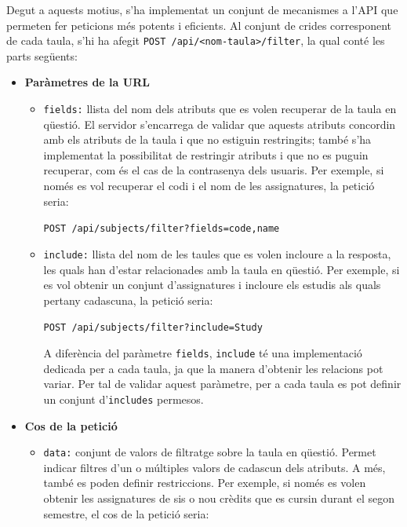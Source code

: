 \documentclass[a4paper,12pt]{ThesisStyle}
\begin{document}
Degut a aquests motius, s'ha implementat un conjunt de mecanismes a l'API que permeten fer peticions més potents i eficients. Al conjunt de crides corresponent de cada taula, s'hi ha afegit \texttt{POST /api/<nom-taula>/filter}, la qual conté les parts següents:
\begin{itemize}
  \item \textbf{Paràmetres de la URL}
  \begin{itemize}
    \item \texttt{fields:} llista del nom dels atributs que es volen recuperar de la taula en qüestió. El servidor s'encarrega de validar que aquests atributs concordin amb els atributs de la taula i que no estiguin restringits; també s'ha implementat la possibilitat de restringir atributs i que no es puguin recuperar, com és el cas de la contrasenya dels usuaris. Per exemple, si només es vol recuperar el codi i el nom de les assignatures, la petició seria:\\[-0.6cm]
    \begin{center}
      \texttt{POST /api/subjects/filter?fields=code,name}
    \end{center}
    \item \texttt{include:} llista del nom de les taules que es volen incloure a la resposta, les quals han d'estar relacionades amb la taula en qüestió. Per exemple, si es vol obtenir un conjunt d'assignatures i incloure els estudis als quals pertany cadascuna, la petició seria:\\[-0.6cm]
    \begin{center}
      \texttt{POST /api/subjects/filter?include=Study}
    \end{center}
    A diferència del paràmetre \texttt{fields}, \texttt{include} té una implementació dedicada per a cada taula, ja que la manera d'obtenir les relacions pot variar. Per tal de validar aquest paràmetre, per a cada taula es pot definir un conjunt d'\texttt{includes} permesos.
  \end{itemize}
  \item \textbf{Cos de la petició}
  \begin{itemize}
    \item \texttt{data:} conjunt de valors de filtratge sobre la taula en qüestió. Permet indicar filtres d'un o múltiples valors de cadascun dels atributs. A més, també es poden definir restriccions. Per exemple, si només es volen obtenir les assignatures de sis o nou crèdits que es cursin durant el segon semestre, el cos de la petició seria:\\[-0.6cm]

\end{itemize}
\end{itemize}
\end{document}
